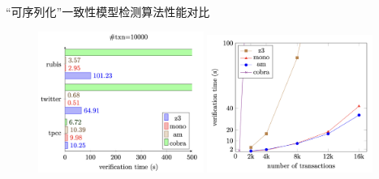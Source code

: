 
\begin{frame}{}
	\begin{center}
		``可序列化''一致性模型检测算法性能对比
	\end{center}

	\begin{figure}[H]
		\centering
		\includegraphics[width=0.48\textwidth]{figs/ser-checker-rubis-twitter-and-tpcc-ntxn10000.png}
		\includegraphics[width=0.48\textwidth]{figs/ser-checker-chengRW-verification-time-vs-ntxns.png}
	\end{figure}
\end{frame}

